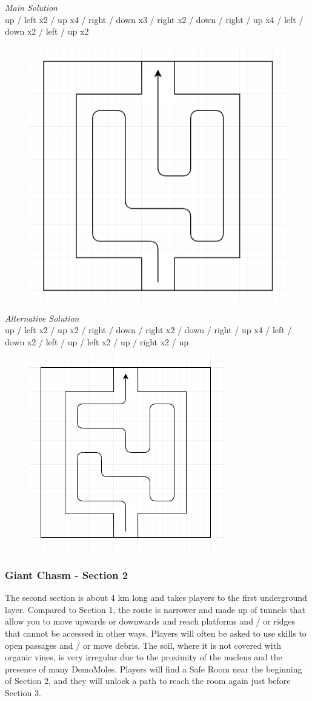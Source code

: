 \textit{Main Solution}\\
up / left x2 / up x4 / right / down x3 / right x2 / down / right / up x4 / left / down x2 / left / up x2\\

\begin{figure}[H]
	\centering
	\includegraphics[width=0.5\linewidth]{images/puzzle/puzzle_011.png}
\end{figure}

\textit{Alternative Solution}\\
up / left x2 / up x2 / right / down / right x2 / down / right / up x4 / left / down x2 / left / up / left x2 / up / right x2 / up\\

\begin{figure}[H]
	\centering
	\includegraphics[width=0.5\linewidth]{images/puzzle/puzzle_012.png}
\end{figure}
\newpage


\subsubsection{Giant Chasm - Section 2}
The second section is about 4 km long and takes players to the first underground layer.
Compared to Section 1, the route is narrower and made up of tunnels that allow you to move upwards or downwards and reach platforms and / or ridges that cannot be accessed in other ways. Players will often be asked to use skills to open passages and / or move debris. The soil, where it is not covered with organic vines, is very irregular due to the proximity of the nucleus and the presence of many DemoMoles. Players will find a Safe Room near the beginning of Section 2, and they will unlock a path to reach the room again just before Section 3.

